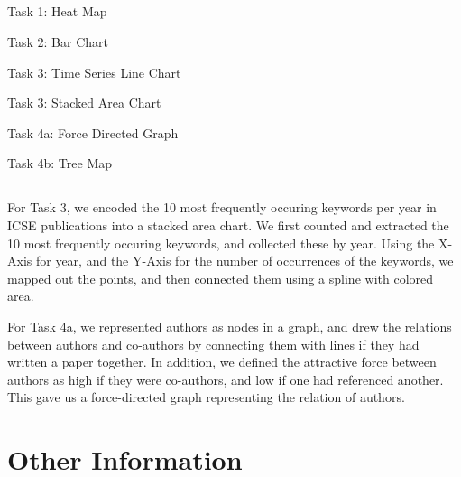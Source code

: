 \documentclass{article}
\begin{document}
\subsection{}
Task 1: Heat Map

Task 2: Bar Chart

Task 3: Time Series Line Chart

Task 3: Stacked Area Chart

Task 4a: Force Directed Graph

Task 4b: Tree Map

\subsection{}
For Task 3, we encoded the 10 most frequently occuring keywords per year in ICSE publications into a stacked area chart. We first counted and extracted the 10 most frequently occuring keywords, and collected these by year. Using the X-Axis for year, and the Y-Axis for the number of occurrences of the keywords, we mapped out the points, and then connected them using a spline with colored area.

For Task 4a, we represented authors as nodes in a graph, and drew the relations between authors and co-authors by connecting them with lines if they had written a paper together. In addition, we defined the attractive force between authors as high if they were co-authors, and low if one had referenced another. This gave us a force-directed graph representing the relation of authors. 

\section{Other Information}
\end{document}
